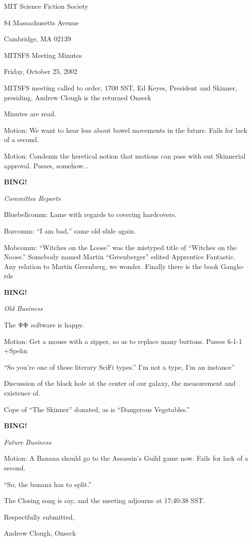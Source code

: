\documentclass[12pt]{article}
\newcommand{\bing}{{\bf BING!} }
\newcommand{\goto}[1]{\bing \vskip 12pt \centerline{{\em{#1}}}}
\begin{document}
\begin{center}

MIT Science Fiction Society

84 Massachusetts Avenue

Cambridge, MA 02139

\vspace{12pt}

MITSFS Meeting Minutes

Friday, October 25, 2002

\end{center}
\vspace{18pt}
\setlength{parskip}{6pt}

\noindent
MITSFS meeting called to order, 1700 SST, Ed Keyes, President and Skinner, presiding.  Andrew Clough is the returned Onseck

Minutes are read.

Motion:  We want to hear less about bowel movements in the future.  Fails for lack of a second.

Motion:  Condemn the heretical notion that motions can pass with out Skinnerial approval.  Passes, somehow...

\goto{Committee Reports}

Bluebellcomm:  Lame with regards to covering hardcovers.

Barcomm:  ``I am bad,''  same old slide again.

Mobcomm:  ``Witches on the Loose'' was the mistyped title of ``Witches on the Noose.''  Somebody named Martin ``Greenberger'' edited Apprentice Fantastic.  Any relation to Martin Greenberg, we wonder.  Finally there is the book Ganglo-rds

\goto{Old Business}

The $\rm \Psi\Phi$ software is happy.

Motion:  Get a mouse with a zipper, so as to replace many buttons.  Passes 6-1-1 +Spehn

``So you're one of those literary SciFi types.''  I'm not a type, I'm an instance''

Discussion of the black hole at the center of our galaxy, the measurement and existence of.

Cope of ``The Skinner'' donated, as is ``Dangerous Vegetables.''

\goto{Future Business}

Motion:  A Banana should go to the Assassin's Guild game now.  Fails for lack of a second.

``So, the banana has to split.''

The Closing song is say, and the meeting adjourns at 17:40:38 SST.

\vspace{18pts}
\centerline{Respectfully submitted,}
\centerline{Andrew Clough, Onseck}
\end{document}
